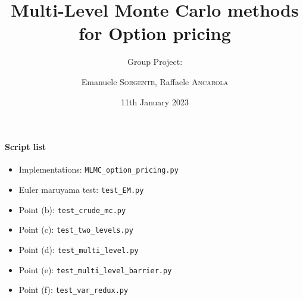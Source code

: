 \documentclass[10pt]{article}
\subtitle{Group Project:}
\title{Multi-Level Monte Carlo methods for Option pricing}
\date{11th January 2023}
\author{Emanuele \textsc{Sorgente}, Raffaele \textsc{Ancarola}}
\begin{document}
\maketitle
\addhead

%









%

%
%
%

\newpage
\printbibliography[
heading=bibintoc, %
title={Bibliography} %
] %

\newpage
\appendix

\lstset{style=colorEX}

%

\paragraph{Script list}
\begin{itemize}
\item Implementations: \texttt{MLMC\_option\_pricing.py}
\item Euler maruyama test: \texttt{test\_EM.py}
\item Point (b): \texttt{test\_crude\_mc.py}
\item Point (c): \texttt{test\_two\_levels.py}
\item Point (d): \texttt{test\_multi\_level.py}
\item Point (e): \texttt{test\_multi\_level\_barrier.py}
\item Point (f): \texttt{test\_var\_redux.py}
\end{itemize}
\end{document}
